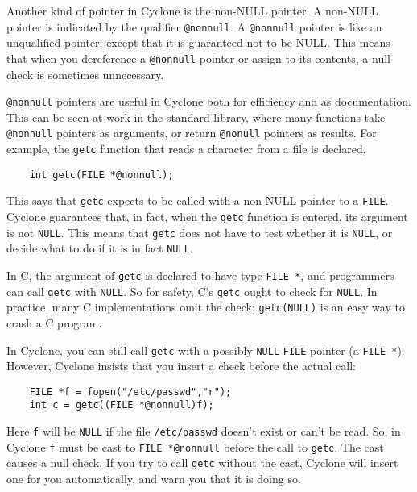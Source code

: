Another kind of pointer in Cyclone is the non-NULL pointer.
A non-NULL pointer is indicated by the qualifier \texttt{@nonnull}.  A
\texttt{@nonnull} pointer is like an unqualified pointer, except that it is
guaranteed not to be NULL\@.  This means that when you dereference a
\texttt{@nonnull} pointer or assign to its contents, a null check is
sometimes unnecessary.

\texttt{@nonnull} pointers are useful in Cyclone both for efficiency and as
documentation.  This can be seen at work in the standard library,
where many functions take \texttt{@nonnull} pointers as arguments, or return
\texttt{@nonull} pointers as results.  For example, the \texttt{getc}
function that reads a character from a file is declared,
\begin{verbatim}
    int getc(FILE *@nonnull);
\end{verbatim}
This says that \texttt{getc} expects to be called with a non-NULL
pointer to a \texttt{FILE}\@.  Cyclone guarantees that, in fact, when
the \texttt{getc} function is entered, its argument is not \texttt{NULL}.  
This means that \texttt{getc} does not have to test whether it is 
\texttt{NULL}, or decide what to do if it is in fact \texttt{NULL}\@.

In C, the argument of \texttt{getc} is declared to have type
\texttt{FILE *}, and programmers can call \texttt{getc} with
\texttt{NULL}\@.  So for safety, C's \texttt{getc} ought to check for
\texttt{NULL}\@.  In practice, many C implementations omit the check;
\texttt{getc(NULL)} is an easy way to crash a C program.

In Cyclone, you can still call \texttt{getc} with a possibly-\texttt{NULL}
\texttt{FILE} pointer (a \texttt{FILE *}).  However, Cyclone insists
that you insert a check before the actual call:
\begin{verbatim}
    FILE *f = fopen("/etc/passwd","r");
    int c = getc((FILE *@nonnull)f);
\end{verbatim}
Here \texttt{f} will be \texttt{NULL} if the file \texttt{/etc/passwd}
doesn't exist or can't be read.  So, in Cyclone \texttt{f} must be
cast to \texttt{FILE *@nonnull} before the call to \texttt{getc}.  The
cast causes a null check.  If you try to call \texttt{getc} without
the cast, Cyclone will insert one for you automatically, and warn you
that it is doing so.

